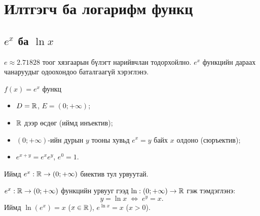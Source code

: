 \section{Илтгэгч ба логарифм функц}

\subsection{$e^x$ ба $\ln x$}
$e\approx2.71828$ тоог хязгаарын бүлэгт нарийвчлан тодорхойлно. $e^x$ функцийн
дараах чанаруудыг одоохондоо баталгаагүй хэрэглэнэ.

\begin{theorem}
$f(x)=e^x$ функц
\begin{itemize}
  \item $D=\mathbb{R}$, $E=(0;+\infty)$;
  \item $\mathbb{R}$ дээр өсдөг (иймд инъектив);
  \item $(0;+\infty)$-ийн дурын $y$ тооны хувьд $e^x=y$ байх $x$ олдоно (сюръектив);
  \item $e^{x+y}=e^xe^y$, \; $e^0=1$.
\end{itemize}
\end{theorem}

Иймд $e^x:\mathbb{R}\to(0;+\infty)$ биектив тул урвуутай.

\begin{definition}
$e^x:\mathbb{R}\to(0;+\infty)$ функцийн урвууг  гээд
$\ln:(0;+\infty)\to\mathbb{R}$ гэж тэмдэглэнэ:
\[
y=\ln x \;\Longleftrightarrow\; e^y=x.
\]
Иймд $\ln(e^x)=x$ \;($x\in\mathbb{R}$), \; $e^{\ln x}=x$ \;($x>0$).
\end{definition}

\begin{center}
\end{center}

